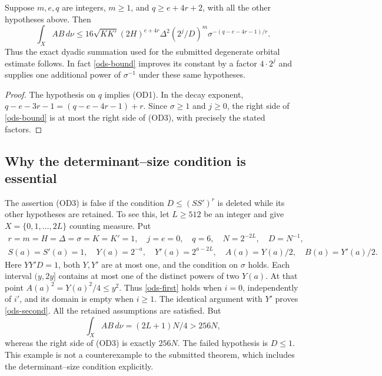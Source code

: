 \begin{corollary}\label{ods-source-bound}
Suppose $m,e,q$ are integers, $m\ge1$, and
$q\ge e+4r+2$, with all the other hypotheses above. Then
\[
 \int_X AB\,d\nu
 \le16\sqrt{KK'}(2H)^{e+4r}\Delta^2
          (2^j/D)^m\sigma^{-(q-e-4r-1)/r}.
                                                               \tag{OD3}
\]
Thus the exact dyadic summation used for the submitted degenerate
orbital estimate follows. In fact \eqref{ods-bound} improves its
constant by a factor $4\cdot2^j$ and supplies one additional power
of $\sigma^{-1}$ under these same hypotheses.
\end{corollary}
\begin{proof}
The hypothesis on $q$ implies (OD1). In the decay exponent,
$q-e-3r-1=(q-e-4r-1)+r$. Since $\sigma\ge1$ and $j\ge0$,
the right side of \eqref{ods-bound} is at most the right side of
(OD3), with precisely the stated factors.
\end{proof}

\subsection{Why the determinant--size condition is essential}

\begin{example}\label{ods-counterexample}
The assertion (OD3) is false if the condition $D\le(SS')^r$ is
deleted while its other hypotheses are retained. To see this,
let $L\ge512$ be an integer and give
$X=\{0,1,\ldots,2L\}$ counting measure. Put
\[
 \begin{gathered}
 r=m=H=\Delta=\sigma=K=K'=1,
 \quad j=e=0,
 \quad q=6,
 \quad N=2^{-2L},\quad D=N^{-1},\\
 S(a)=S'(a)=1,\quad
 Y(a)=2^{-a},\quad Y'(a)=2^{a-2L},
 \quad A(a)=Y(a)/2,\quad B(a)=Y'(a)/2.
 \end{gathered}
\]
Here $YY'D=1$, both $Y,Y'$ are at most one, and the condition
on $\sigma$ holds. Each interval $(y,2y]$ contains at most one
of the distinct powers of two $Y(a)$. At that point
$A(a)^2=Y(a)^2/4\le y^2$. Thus \eqref{ods-first} holds when
$i=0$, independently of $i'$, and its domain is empty when
$i\ge1$. The identical argument with $Y'$ proves
\eqref{ods-second}. All the retained assumptions are satisfied.
But
\[
                  \int_XAB\,d\nu=(2L+1)N/4>256N,
\]
whereas the right side of (OD3) is exactly $256N$.
The failed hypothesis is $D\le1$.
This example is not a counterexample to the submitted theorem,
which includes the determinant--size condition explicitly.
\end{example}

